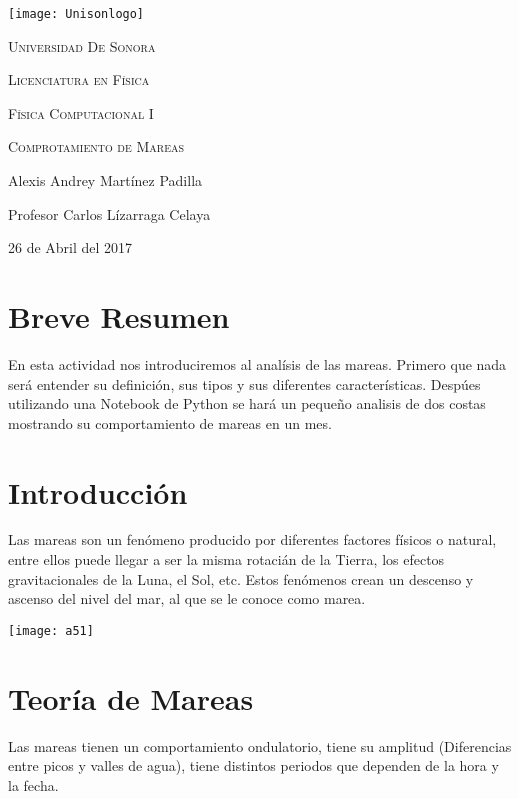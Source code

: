 \documentclass[12pt,a4paper]{article}
\begin{document}
\begin{titlepage}
	\centering
	\texttt{[image: Unisonlogo]}\par
    \vspace{1.3cm}
	\scshape \LARGE Universidad De Sonora \par
	\vspace{1cm}
	\scshape \Large Licenciatura en Física \par
    \scshape \Large Física Computacional I \par
	\vspace{1.5cm}
	\huge \scshape Comprotamiento de Mareas \par
	\vspace{2cm}
	\Large Alexis Andrey Martínez Padilla\par
    \Large Profesor Carlos Lízarraga Celaya\par
    \vspace{2.5cm}
    \Large 26 de Abril del 2017
\end{titlepage}

\section{Breve Resumen}
En esta actividad nos introduciremos al analísis de las mareas. Primero que nada será entender su definición, sus tipos y sus diferentes características. Despúes utilizando una Notebook de Python se hará un pequeño analisis de dos costas mostrando su comportamiento de mareas en un mes.

\section{Introducción}
Las mareas son un fenómeno producido por diferentes factores físicos o natural, entre ellos puede llegar a ser la misma rotacián de la Tierra, los efectos gravitacionales de la Luna, el Sol, etc. Estos fenómenos crean un descenso y ascenso del nivel del mar, al que se le conoce como marea.

\begin{center}
\texttt{[image: a51]}
\end{center}

\section{Teoría de Mareas}
Las mareas tienen un comportamiento ondulatorio, tiene su amplitud (Diferencias entre picos y valles de agua), tiene distintos periodos que dependen de la hora y la fecha.
\end{document}
